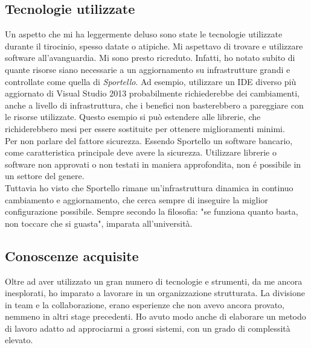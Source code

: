 \subsection{Tecnologie utilizzate}
Un aspetto che mi ha leggermente deluso sono state le tecnologie utilizzate durante il tirocinio, spesso datate o atipiche. Mi aspettavo di trovare e utilizzare software all'avanguardia. Mi sono presto ricreduto. Infatti, ho notato subito di quante risorse siano necessarie a un aggiornamento su infrastrutture grandi e controllate come quella di \textit{Sportello}. Ad esempio, utilizzare un IDE diverso più aggiornato di Visual Studio 2013 probabilmente richiederebbe dei cambiamenti, anche a livello di infrastruttura, che i benefici non basterebbero a pareggiare con le risorse utilizzate. Questo esempio si può estendere alle librerie, che richiderebbero mesi per essere sostituite per ottenere miglioramenti minimi. \\ Per non parlare del fattore sicurezza. Essendo Sportello un software bancario, come caratteristica principale deve avere la sicurezza. Utilizzare librerie o software non approvati o non testati in maniera approfondita, non é possibile in un settore del genere. \\
Tuttavia ho visto che Sportello rimane un'infrastruttura dinamica in continuo cambiamento e aggiornamento, che cerca sempre di inseguire la miglior configurazione possibile. Sempre secondo la filosofia: "se funziona quanto basta, non toccare che si guasta", imparata all'università.

\subsection{Conoscenze acquisite}
Oltre ad aver utilizzato un gran numero di tecnologie e strumenti, da me ancora inesplorati, ho imparato a lavorare in un organizzazione strutturata. La divisione in team e la collaborazione, erano esperienze che non avevo ancora provato, nemmeno in altri stage precedenti. Ho avuto modo anche di elaborare un metodo di lavoro adatto ad approciarmi a grossi sistemi, con un grado di complessità elevato.
